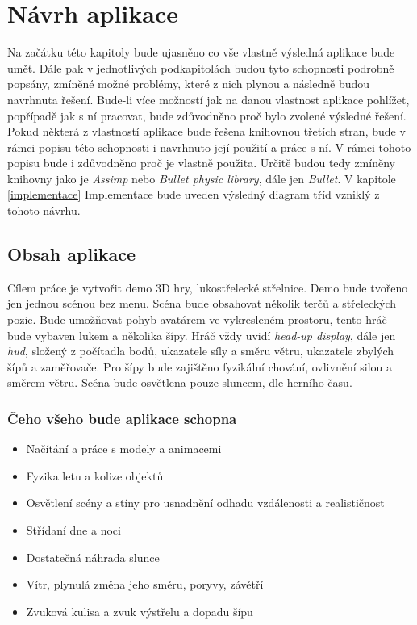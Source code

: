 \chapter{Návrh aplikace}\label{Navrh_aplikace}
Na začátku této kapitoly bude ujasněno co vše vlastně výsledná aplikace bude umět. Dále pak v jednotlivých podkapitolách budou tyto schopnosti podrobně popsány, zmíněné možné problémy, které z nich plynou a následně budou navrhnuta řešení. Bude-li více možností jak na danou vlastnost aplikace pohlížet, popřípadě jak s ní pracovat,  bude zdůvodněno proč bylo zvolené výsledné řešení. Pokud některá z vlastností aplikace bude řešena knihovnou třetích stran, bude v rámci popisu této schopnosti i navrhnuto její použití a práce s ní. V rámci tohoto popisu bude i zdůvodněno proč je vlastně použita. Určitě budou tedy zmíněny knihovny jako je \emph{Assimp}\cite{assimp}  nebo \emph{Bullet physic library}\cite{bullet}, dále jen \emph{Bullet}. V kapitole \ref{implementace} Implementace  bude uveden výsledný diagram tříd vzniklý z tohoto návrhu.
\section{Obsah aplikace}
Cílem práce je vytvořit demo 3D hry, lukostřelecké střelnice. Demo bude tvořeno jen jednou scénou bez menu. Scéna bude obsahovat několik terčů a střeleckých pozic. Bude umožňovat pohyb avatárem ve vykresleném prostoru, tento hráč bude vybaven  lukem a několika šípy. Hráč vždy uvidí \emph{head-up display}, dále jen \emph{hud}, složený z počítadla bodů, ukazatele síly a směru větru, ukazatele zbylých šípů a zaměřovače. Pro šípy bude zajištěno fyzikální chování, ovlivnění silou a směrem větru. Scéna bude osvětlena pouze sluncem, dle herního času.
\subsection{Čeho všeho bude aplikace schopna}
\begin{itemize}
	\item Načítání a práce s modely a animacemi
	\item Fyzika letu a kolize objektů
	\item Osvětlení scény a stíny pro usnadnění odhadu vzdálenosti a realističnost
	\item Střídaní dne a noci
	\item Dostatečná náhrada slunce
	\item Vítr, plynulá změna jeho směru, poryvy, závětří
	\item Zvuková kulisa a zvuk výstřelu a dopadu šípu
\end{itemize}
